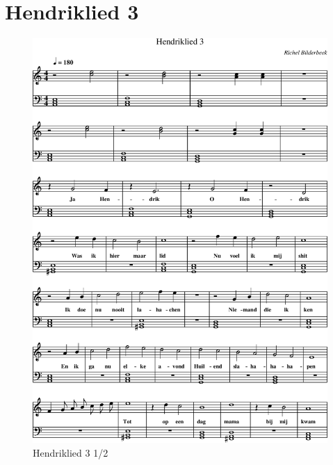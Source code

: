 \chapter{Hendriklied 3}



\begin{figure}[!htbp]
  \includegraphics[width=\textwidth,height=\textheight,keepaspectratio]{../songs/13_hendriklied_3-0.png}
  \caption{Hendriklied 3 1/2}
  \label{fig:13_hendriklied_3_1}
\end{figure}


